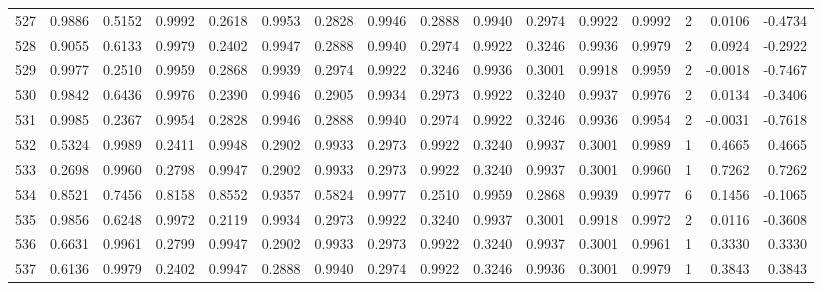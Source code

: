 \begin{tabular}{lrrrrrrrrrrrrrrr}
527 &      0.9886 &  0.5152 &  0.9992 &  0.2618 &  0.9953 &  0.2828 &  0.9946 &  0.2888 &  0.9940 &  0.2974 &   0.9922 &     0.9992 &      2 &                    0.0106 &                    -0.4734 \\
528 &      0.9055 &  0.6133 &  0.9979 &  0.2402 &  0.9947 &  0.2888 &  0.9940 &  0.2974 &  0.9922 &  0.3246 &   0.9936 &     0.9979 &      2 &                    0.0924 &                    -0.2922 \\
529 &      0.9977 &  0.2510 &  0.9959 &  0.2868 &  0.9939 &  0.2974 &  0.9922 &  0.3246 &  0.9936 &  0.3001 &   0.9918 &     0.9959 &      2 &                   -0.0018 &                    -0.7467 \\
530 &      0.9842 &  0.6436 &  0.9976 &  0.2390 &  0.9946 &  0.2905 &  0.9934 &  0.2973 &  0.9922 &  0.3240 &   0.9937 &     0.9976 &      2 &                    0.0134 &                    -0.3406 \\
531 &      0.9985 &  0.2367 &  0.9954 &  0.2828 &  0.9946 &  0.2888 &  0.9940 &  0.2974 &  0.9922 &  0.3246 &   0.9936 &     0.9954 &      2 &                   -0.0031 &                    -0.7618 \\
532 &      0.5324 &  0.9989 &  0.2411 &  0.9948 &  0.2902 &  0.9933 &  0.2973 &  0.9922 &  0.3240 &  0.9937 &   0.3001 &     0.9989 &      1 &                    0.4665 &                     0.4665 \\
533 &      0.2698 &  0.9960 &  0.2798 &  0.9947 &  0.2902 &  0.9933 &  0.2973 &  0.9922 &  0.3240 &  0.9937 &   0.3001 &     0.9960 &      1 &                    0.7262 &                     0.7262 \\
534 &      0.8521 &  0.7456 &  0.8158 &  0.8552 &  0.9357 &  0.5824 &  0.9977 &  0.2510 &  0.9959 &  0.2868 &   0.9939 &     0.9977 &      6 &                    0.1456 &                    -0.1065 \\
535 &      0.9856 &  0.6248 &  0.9972 &  0.2119 &  0.9934 &  0.2973 &  0.9922 &  0.3240 &  0.9937 &  0.3001 &   0.9918 &     0.9972 &      2 &                    0.0116 &                    -0.3608 \\
536 &      0.6631 &  0.9961 &  0.2799 &  0.9947 &  0.2902 &  0.9933 &  0.2973 &  0.9922 &  0.3240 &  0.9937 &   0.3001 &     0.9961 &      1 &                    0.3330 &                     0.3330 \\
537 &      0.6136 &  0.9979 &  0.2402 &  0.9947 &  0.2888 &  0.9940 &  0.2974 &  0.9922 &  0.3246 &  0.9936 &   0.3001 &     0.9979 &      1 &                    0.3843 &                     0.3843 \\

\end{tabular}
